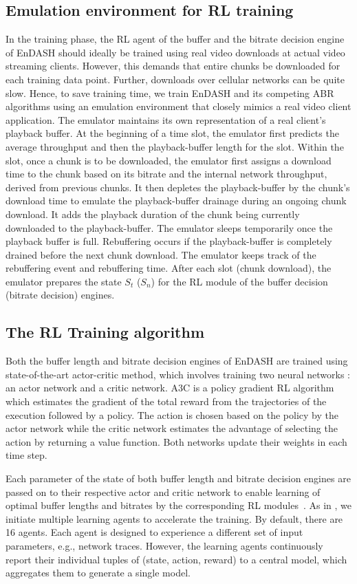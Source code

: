 \subsection{Emulation environment for \ac{RL} training}
In the training phase, the \ac{RL} agent of the buffer and the bitrate decision engine of EnDASH should ideally be trained using real video downloads at actual video streaming clients. 
However, this demands that entire chunks be downloaded for each training data point. Further, downloads over cellular networks can be quite slow. Hence, to save training time, we train EnDASH and its competing  ABR algorithms using an emulation environment that closely mimics a real video client application. The emulator maintains its own representation of a real client's playback buffer. At the beginning of a time slot, the emulator first predicts the average throughput and then the playback-buffer length for the slot. Within the slot, once a chunk is to be downloaded, the emulator first assigns a download time to the chunk based  on its bitrate and the internal network throughput, derived from previous chunks. It then depletes the playback-buffer by the chunk's download time to emulate the playback-buffer drainage during an ongoing chunk download. It adds the playback duration of the  chunk being currently downloaded to the playback-buffer. The emulator sleeps temporarily once the playback buffer is full. Rebuffering occurs if the playback-buffer is completely drained before the next chunk download. The emulator keeps track of the rebuffering event and rebuffering time. After each slot (chunk download), the emulator prepares the state $S_t$ ($S_n$) for the \ac{RL} module of the buffer decision (bitrate decision) engines.
\subsection{The \ac{RL} Training algorithm}
Both the buffer length and bitrate decision engines of EnDASH are trained using  state-of-the-art actor-critic method, which involves training two neural networks \cite{mao2017neural}: an actor network and a critic network. A3C is a policy gradient \ac{RL} algorithm which estimates the gradient of the total reward from the trajectories of the execution followed by a policy. The action is chosen based on the policy by the actor network while the critic network estimates the advantage of selecting the action by returning a value function. Both networks update their weights in each time step.
 
\indent Each parameter of the state  of both buffer length and bitrate decision engines are passed on to their respective actor and critic network to enable learning of optimal buffer lengths and bitrates by the corresponding \ac{RL} modules~\cite{mao2017neural}.
As in \cite{mao2017neural}, we initiate multiple learning agents to accelerate the training. By default, there are 16 agents. Each agent is designed to experience a different set of input parameters, e.g., network traces. However, the learning agents continuously report  their individual tuples of (state, action, reward)  to a central model, which aggregates them to generate a single model.
